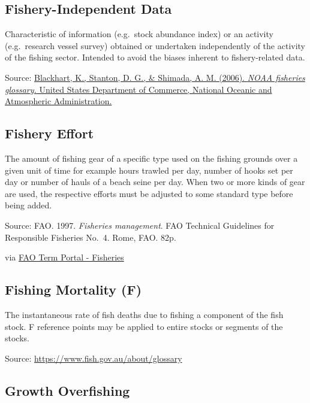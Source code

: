 \documentclass[
  11pt,
]{book}
\begin{document}
\hypertarget{fishery-independent-data}{%
\subsection{Fishery-Independent Data}\label{fishery-independent-data}}

Characteristic of information (e.g.~stock abundance index) or an activity (e.g.~research vessel survey) obtained or undertaken independently of the activity of the ﬁshing sector. Intended to avoid the biases inherent to ﬁshery-related data.

Source: \href{https://repository.library.noaa.gov/view/noaa/12856}{Blackhart, K., Stanton, D. G., \& Shimada, A. M. (2006). \emph{NOAA fisheries glossary.} United States Department of Commerce, National Oceanic and Atmospheric Administration.}

\hypertarget{fishery-effort}{%
\subsection{Fishery Effort}\label{fishery-effort}}

The amount of fishing gear of a specific type used on the fishing grounds over a given unit of time for example hours trawled per day, number of hooks set per day or number of hauls of a beach seine per day. When two or more kinds of gear are used, the respective efforts must be adjusted to some standard type before being added.

Source: FAO. 1997. \emph{Fisheries management}. FAO Technical Guidelines for Responsible Fisheries No.~4. Rome, FAO. 82p.

via \href{http://www.fao.org/fishery/glossary/en}{FAO Term Portal - Fisheries}

\hypertarget{fishing-mortality-f}{%
\subsection{Fishing Mortality (F)}\label{fishing-mortality-f}}

The instantaneous rate of fish deaths due to fishing a component of the fish stock. F reference points may be applied to entire stocks or segments of the stocks.

Source: \url{https://www.fish.gov.au/about/glossary}

\hypertarget{growth-overfishing}{%
\subsection{Growth Overfishing}\label{growth-overfishing}}
\end{document}
